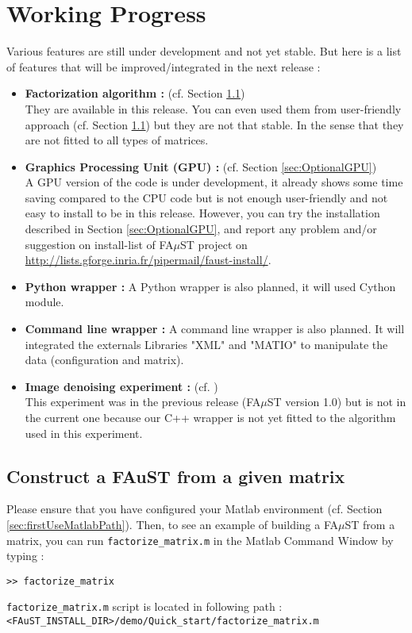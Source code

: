 \chapter{Working Progress}\label{sec:WorkingProgress}
	Various features are still under development and not yet stable.
But here is a list of features that will be improved/integrated in the next release :
\begin{itemize}
	\item \textbf{Factorization algorithm :} (cf. Section \ref{sec:WorkingProgressBuildFromMatrix})\\ 
They are available in this release. You can even used them
from user-friendly approach (cf. Section \ref{sec:WorkingProgressBuildFromMatrix}) but they are not
that stable. In the sense that they are not fitted to all types of matrices.
	\item \textbf{Graphics Processing Unit (GPU) :} (cf. Section \ref{sec:OptionalGPU})\\
A GPU version of the code is under development, it already shows 
some time saving compared to the CPU code but is not enough user-friendly and not easy to install to be in this release. However, you can try the installation described in Section \ref{sec:OptionalGPU}, and report any problem and/or suggestion on install-list of FA$\mu$ST project on \url{http://lists.gforge.inria.fr/pipermail/faust-install/}. 
	\item \textbf{Python wrapper :} A Python wrapper is also planned, it will used Cython module.
	\item \textbf{Command line wrapper :} A command line wrapper is also planned. It will integrated the externals Libraries "XML" and "MATIO" to manipulate the data (configuration and matrix). 
	\item \textbf{Image denoising experiment :} (cf. \cite[chapter VI.]{LeMagoarou2016}) \\
This experiment was in the previous release (FA$\mu$ST version 1.0) but is not in the current one because our C++ wrapper is not yet fitted to the algorithm used in this experiment.    
\end{itemize}

\section{Construct a FAuST from a given matrix}\label{sec:WorkingProgressBuildFromMatrix}
Please ensure that you have configured your Matlab environment (cf. Section \ref{sec:firstUseMatlabPath}). Then, to see an example of building a FA$\mu$ST from a matrix, you can run \texttt{factorize\_matrix.m} in the Matlab Command Window by typing :
\lstset{style=customMatlab}
\begin{lstlisting}
>> factorize_matrix
\end{lstlisting}
\texttt{factorize\_matrix.m} script is located in following path :\\
\texttt{<FAuST\_INSTALL\_DIR>/demo/Quick\_start/factorize\_matrix.m} \\

